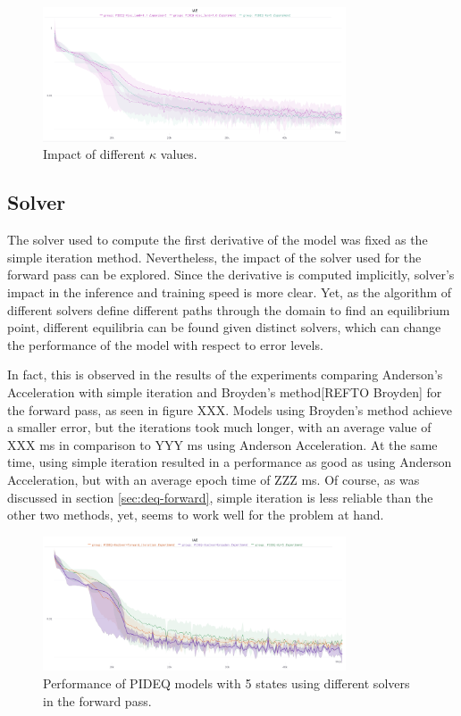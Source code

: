 \begin{figure}[h] %
    \centering
    \includegraphics[width=0.8\textwidth]{images/exp_4_iae.png}
    \caption{Impact of different $\kappa$ values.}
    \label{fig:images-exp_4_iae-png}
\end{figure}

\subsection{Solver}

The solver used to compute the first derivative of the model was fixed as the simple iteration method.
Nevertheless, the impact of the solver used for the forward pass can be explored.
Since the derivative is computed implicitly, solver's impact in the inference and training speed is more clear.
Yet, as the algorithm of different solvers define different paths through the domain to find an equilibrium point, different equilibria can be found given distinct solvers, which can change the performance of the model with respect to error levels. 

In fact, this is observed in the results of the experiments comparing Anderson's Acceleration with simple iteration and Broyden's method[REFTO Broyden] for the forward pass, as seen in figure XXX.
Models using Broyden's method achieve a smaller error, but the iterations took much longer, with an average value of XXX ms in comparison to YYY ms using Anderson Acceleration.  %
At the same time, using simple iteration resulted in a performance as good as using Anderson Acceleration, but with an average epoch time of ZZZ ms.
Of course, as was discussed in section \ref{sec:deq-forward}, simple iteration is less reliable than the other two methods, yet, seems to work well for the problem at hand.

\begin{figure}[h] %
    \centering
    \includegraphics[width=0.8\textwidth]{images/exp_5_iae.png}
    \caption{Performance of \gls{PIDEQ} models with 5 states using different solvers in the forward pass.}
    \label{fig:images-exp_5_iae-png}
\end{figure}

